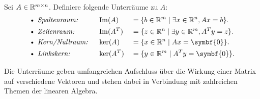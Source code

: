 \begin{definition}\label{df:four}
    Sei \(A \in \mathbb{R}^{m \times n}\). Definiere folgende Unterräume zu \(A\): 
    \begin{alignat*}{3}
        \text{\textbullet } &\textit{ Spaltenraum: } 
        &&\Img(A) &{}={}& \{ b \in \R^m \mid \exists x \in \R^n, Ax = b \}. \\
        \text{\textbullet } &\textit{ Zeilenraum: }
        &&\Img(A^{T}) &{}={}& \{ z \in \R^n \mid \exists y \in \R^m, A^{T}y = z \}.\\
        \text{\textbullet } &\textit{ Kern/Nullraum: }
        &&\ker(A) &{}={}& \{ x \in \R^n \mid Ax = \symbf{0} \}.\\
        \text{\textbullet } &\textit{ Linkskern: }
        &&\ker(A^{T}) &{}={}& \{ y \in \R^m \mid A^{T}y = \symbf{0} \}.
    \end{alignat*}
\end{definition}
Die Unterräume geben umfangreichen Aufschluss über die Wirkung einer Matrix auf verschiedene Vektoren und stehen dabei in Verbindung mit zahlreichen Themen der linearen Algebra.

